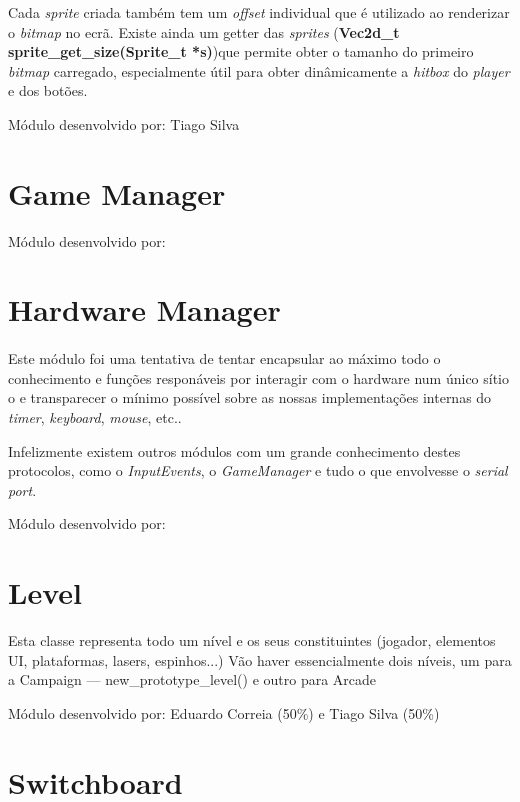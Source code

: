 \documentclass{report}
\begin{document}
Cada \textit{sprite} criada também tem um \textit{offset} individual que é utilizado ao renderizar o \textit{bitmap} no ecrã. Existe ainda um getter das \textit{sprites} (\textbf{Vec2d\_t sprite\_get\_size(Sprite\_t *s)})que permite obter o tamanho do primeiro \textit{bitmap} carregado, especialmente útil para obter dinâmicamente a \textit{hitbox} do \textit{player} e dos botões.\newline

Módulo desenvolvido por: Tiago Silva

\section{Game Manager}

Módulo desenvolvido por: 

\section{Hardware Manager}

\paragraph{}
Este módulo foi uma tentativa de tentar encapsular ao máximo todo o conhecimento e funções responáveis por interagir com o hardware num único sítio o e transparecer o mínimo possível sobre as nossas implementações internas do \textit{timer}, \textit{keyboard}, \textit{mouse}, etc..

Infelizmente existem outros módulos com um grande conhecimento destes protocolos, como o \textit{InputEvents}, o \textit{GameManager} e tudo o que envolvesse o \textit{serial port}.\newline

Módulo desenvolvido por: 

\section{Level}

Esta classe representa todo um nível e os seus constituintes (jogador, elementos UI, plataformas, lasers, espinhos...)
Vão haver essencialmente dois níveis, um para a Campaign --- new\_prototype\_level() e outro para Arcade\newline

Módulo desenvolvido por: Eduardo Correia (50\%) e Tiago Silva (50\%) 

\section{Switchboard}
\end{document}
